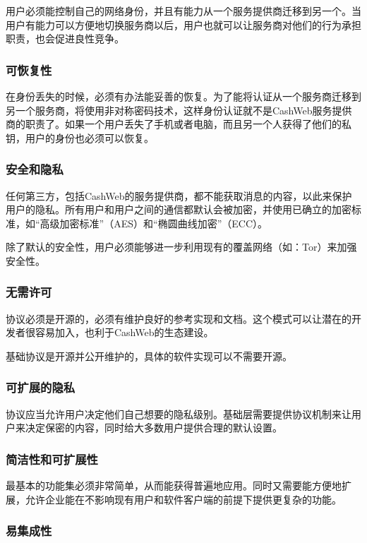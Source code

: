 \documentclass{article}
\begin{document}
用户必须能控制自己的网络身份，并且有能力从一个服务提供商迁移到另一个。当用户有能力可以方便地切换服务商以后，用户也就可以让服务商对他们的行为承担职责，也会促进良性竞争。

\subsubsection{可恢复性}

在身份丢失的时候，必须有办法能妥善的恢复。为了能将认证从一个服务商迁移到另一个服务商，将使用非对称密码技术，这样身份认证就不是CashWeb服务提供商的职责了。如果一个用户丢失了手机或者电脑，而且另一个人获得了他们的私钥，用户的身份也必须可以恢复。

\subsubsection{安全和隐私}

任何第三方，包括CashWeb的服务提供商，都不能获取消息的内容，以此来保护用户的隐私。所有用户和用户之间的通信都默认会被加密，并使用已确立的加密标准，如“高级加密标准”（AES）和“椭圆曲线加密”（ECC）。

除了默认的安全性，用户必须能够进一步利用现有的覆盖网络（如：Tor）来加强安全性。

\subsubsection{无需许可}

协议必须是开源的，必须有维护良好的参考实现和文档。这个模式可以让潜在的开发者很容易加入，也利于CashWeb的生态建设。

基础协议是开源并公开维护的，具体的软件实现可以不需要开源。

\subsubsection{可扩展的隐私}

协议应当允许用户决定他们自己想要的隐私级别。基础层需要提供协议机制来让用户来决定保密的内容，同时给大多数用户提供合理的默认设置。

\subsubsection{简洁性和可扩展性}

最基本的功能集必须非常简单，从而能获得普遍地应用。同时又需要能方便地扩展，允许企业能在不影响现有用户和软件客户端的前提下提供更复杂的功能。

\subsubsection{易集成性}
\end{document}
